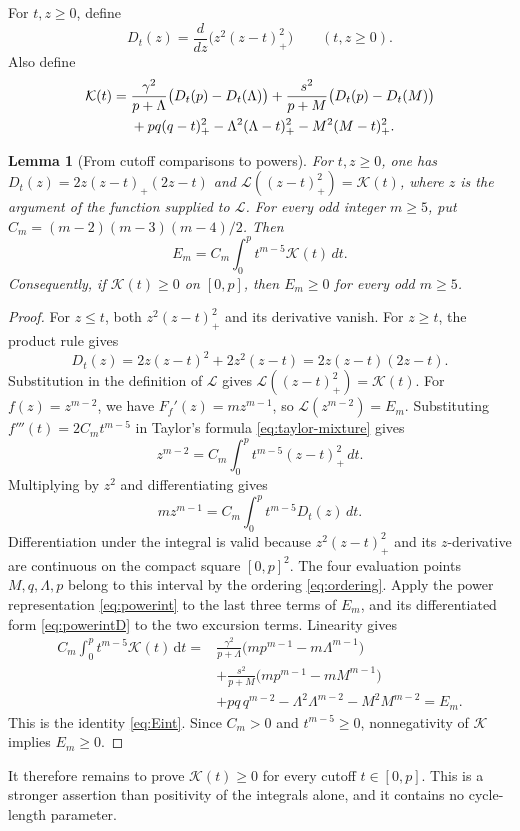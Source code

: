 \documentclass[11pt]{article}
\numberwithin{equation}{section}
\newtheorem{lemma}[theorem]{Lemma}
\newcommand{\dd}{\,\mathrm d}
\begin{document}
For $t,z\ge0$, define
\begin{equation}\label{eq:D}
 D_t(z)=\frac{d}{dz}\bigl(z^2(z-t)_+^2\bigr)
       \qquad(t,z\ge0).
\end{equation}
Also define
\begin{align}\label{eq:K}
 \mathcal K(t)={}&
 \frac{\gamma^2}{p+\Lambda}\bigl(D_t(p)-D_t(\Lambda)\bigr)
 +\frac{s^2}{p+M}\bigl(D_t(p)-D_t(M)\bigr)\notag\\
 &+pq(q-t)_+^2-\Lambda^2(\Lambda-t)_+^2-M^2(M-t)_+^2.
\end{align}
\begin{lemma}[From cutoff comparisons to powers]\label{lem:power-mixture}
For $t,z\ge0$, one has
$D_t(z)=2z(z-t)_+(2z-t)$ and
$\mathcal L((z-t)_+^2)=\mathcal K(t)$, where $z$ is the
argument of the function supplied to $\mathcal L$.
For every odd integer $m\ge5$, put
$C_m=(m-2)(m-3)(m-4)/2$. Then
\begin{equation}\label{eq:Eint}
 E_m=C_m\int_0^p t^{m-5}\mathcal K(t)\,dt.
\end{equation}
Consequently, if $\mathcal K(t)\ge0$ on $[0,p]$, then $E_m\ge0$
for every odd $m\ge5$.
\end{lemma}
\begin{proof}
For $z\le t$, both $z^2(z-t)_+^2$ and its derivative vanish.
For $z\ge t$, the product rule gives
\[
 D_t(z)=2z(z-t)^2+2z^2(z-t)=2z(z-t)(2z-t).
\]
Substitution in the definition of $\mathcal L$ gives
$\mathcal L((z-t)_+^2)=\mathcal K(t)$.
For $f(z)=z^{m-2}$, we have $F_f'(z)=mz^{m-1}$, so
$\mathcal L(z^{m-2})=E_m$. Substituting
$f'''(t)=2C_m t^{m-5}$ in Taylor's formula
\eqref{eq:taylor-mixture} gives
\begin{equation}\label{eq:powerint}
 z^{m-2}=C_m\int_0^p t^{m-5}(z-t)_+^2\,dt.
\end{equation}
Multiplying by $z^2$ and differentiating gives
\begin{equation}\label{eq:powerintD}
 mz^{m-1}=C_m\int_0^p t^{m-5}D_t(z)\,dt.
\end{equation}
Differentiation under the integral is valid because
$z^2(z-t)_+^2$ and its $z$-derivative are continuous on the compact
square $[0,p]^2$. The four evaluation points $M,q,\Lambda,p$
belong to this interval by the ordering \eqref{eq:ordering}.
Apply the power representation \eqref{eq:powerint} to the last
three terms of $E_m$, and its differentiated form
\eqref{eq:powerintD} to the two excursion terms. Linearity gives
\begin{align*}
 C_m\int_0^p t^{m-5}\mathcal K(t)\dd t
 ={}&\frac{\gamma^2}{p+\Lambda}
       \bigl(mp^{m-1}-m\Lambda^{m-1}\bigr)\\
 &+\frac{s^2}{p+M}\bigl(mp^{m-1}-mM^{m-1}\bigr)\\
 &+pq\,q^{m-2}-\Lambda^2\Lambda^{m-2}-M^2M^{m-2}
 =E_m.
\end{align*}
This is the identity \eqref{eq:Eint}. Since $C_m>0$ and
$t^{m-5}\ge0$, nonnegativity of $\mathcal K$ implies $E_m\ge0$.
\end{proof}
It therefore remains to prove $\mathcal K(t)\ge0$ for every cutoff $t\in[0,p]$. This is a stronger assertion than positivity of the integrals alone, and it contains no cycle-length parameter.
\end{document}
